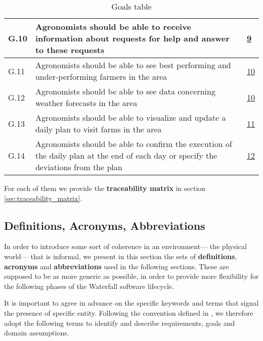 \begin{table}[H]
\begin{tabular}{|l|m{}|l|}
        \hline
        G.10                                                      &  Agronomists should be able to receive information about requests for help and answer to these requests   &    \hyperref[sec:agronomistsNeeds]{9}\\%
        \hline
        G.11                                               &     Agronomists should be able to see best performing and under-performing farmers in the area &   \hyperref[sec:agronomistsNeeds]{10} \\
        \hline
        G.12                                              &   Agronomists should be able to see data concerning weather forecasts in the area     &   \hyperref[sec:agronomistsNeeds]{10} \\
        \hline
        G.13                                               &     Agronomists should be able to visualize and update a daily plan to visit farms in the area &   \hyperref[sec:agronomistsNeeds]{11} \\
        \hline
        G.14                                              &   Agronomists should be able to confirm the execution of the daily plan at the end of each day or specify the deviations from the plan     &   \hyperref[sec:agronomistsNeeds]{12} \\
        \hline
    \end{tabular}
    
    \caption{\label{tab:goals}Goals table}
\end{table}


For each of them we provide the \textbf{traceability matrix} in section \ref{sec:traceability_matrix}.

\subsection{Definitions, Acronyms, Abbreviations}
\label{sec:def_acr_abr}
In order to introduce some sort of coherence in an environment--- the physical world--- that is informal, we present in this section the sets of \textbf{definitions}, \textbf{acronyms} and \textbf{abbreviations} used in the following sections. These are supposed to be as more generic as possible, in order to provide more flexibility for the following phases of the Waterfall software lifecycle.

It is important to agree in advance on the specific keywords and terms that signal the presence of specific entity. Following the convention defined in \cite{iso_ieee_standard}, we therefore adopt the following terms to identify and describe requirements, goals and domain assumptions.

